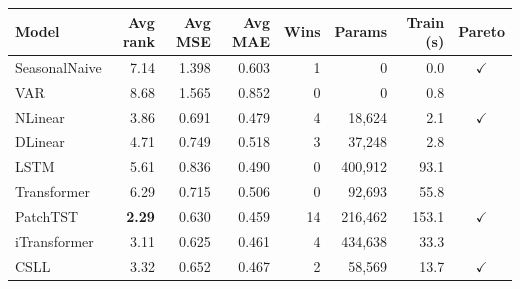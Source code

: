 \begin{tabular}{lrrrrrrc}
\toprule
Model & Avg rank & Avg MSE & Avg MAE & Wins & Params & Train (s) & Pareto \\
\midrule
SeasonalNaive & 7.14 & 1.398 & 0.603 & 1 & 0 & 0.0 & $\checkmark$ \\
VAR & 8.68 & 1.565 & 0.852 & 0 & 0 & 0.8 &  \\
NLinear & 3.86 & 0.691 & 0.479 & 4 & 18,624 & 2.1 & $\checkmark$ \\
DLinear & 4.71 & 0.749 & 0.518 & 3 & 37,248 & 2.8 &  \\
LSTM & 5.61 & 0.836 & 0.490 & 0 & 400,912 & 93.1 &  \\
Transformer & 6.29 & 0.715 & 0.506 & 0 & 92,693 & 55.8 &  \\
PatchTST & \textbf{2.29} & 0.630 & 0.459 & 14 & 216,462 & 153.1 & $\checkmark$ \\
iTransformer & 3.11 & 0.625 & 0.461 & 4 & 434,638 & 33.3 &  \\
CSLL & 3.32 & 0.652 & 0.467 & 2 & 58,569 & 13.7 & $\checkmark$ \\
\bottomrule
\end{tabular}